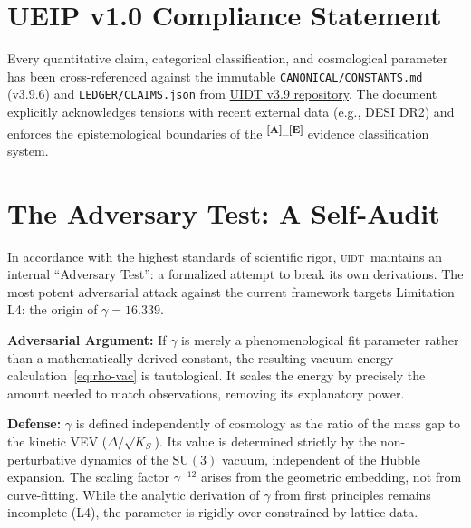 \documentclass[12pt,a4paper,twoside]{article}
\theoremstyle{plain}
\theoremstyle{definition}
\theoremstyle{remark}
\newcommand{\UIDT}{\textsc{uidt}}
\newcommand{\catmark}[1]{\textsuperscript{\textsf{\textbf{[#1]}}}}
\newcommand{\GammaGeom}{16.339}                     %
\begin{document}
\section{UEIP v1.0 Compliance Statement}
\label{sec:ueip}

Every quantitative claim, categorical classification, and cosmological parameter has been cross-referenced against the immutable \texttt{CANONICAL/CONSTANTS.md} (v3.9.6) and \texttt{LEDGER/CLAIMS.json} from \href{https://github.com/Mass-Gap/UIDT-Framework-v3.9-Canonical}{UIDT v3.9 repository}. The document explicitly acknowledges tensions with recent external data (e.g., DESI DR2) and enforces the epistemological boundaries of the \catmark{A}--\catmark{E} evidence classification system.

\section{The Adversary Test: A Self-Audit}
\label{sec:adversary}

In accordance with the highest standards of scientific rigor, \UIDT\ maintains
an internal ``Adversary Test'': a formalized attempt to break its own derivations.
The most potent adversarial attack against the current framework targets
Limitation L4: the origin of $\gamma = \GammaGeom$.

\textbf{Adversarial Argument:} If $\gamma$ is merely a phenomenological fit
parameter rather than a mathematically derived constant, the resulting vacuum
energy calculation~\eqref{eq:rho-vac} is tautological. It scales the energy
by precisely the amount needed to match observations, removing its explanatory
power.

\textbf{Defense:} $\gamma$ is defined independently of cosmology as the ratio
of the mass gap to the kinetic VEV ($\Delta/\sqrt{K_S}$). Its value is
determined strictly by the non-perturbative dynamics of the $\mathrm{SU}(3)$
vacuum, independent of the Hubble expansion. The scaling factor $\gamma^{-12}$
arises from the geometric embedding, not from curve-fitting. While the analytic
derivation of $\gamma$ from first principles remains incomplete (L4), the
parameter is rigidly over-constrained by lattice data.
\end{document}
